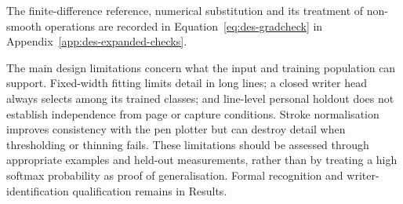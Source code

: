The finite-difference reference, numerical substitution and its treatment of non-smooth operations are recorded in Equation~\ref{eq:des-gradcheck} in Appendix~\ref{app:des-expanded-checks}.

The main design limitations concern what the input and training population can support. Fixed-width fitting limits detail in long lines; a closed writer head always selects among its trained classes; and line-level personal holdout does not establish independence from page or capture conditions. Stroke normalisation improves consistency with the pen plotter but can destroy detail when thresholding or thinning fails. These limitations should be assessed through appropriate examples and held-out measurements, rather than by treating a high softmax probability as proof of generalisation. Formal recognition and writer-identification qualification remains in Results.
\FloatBarrier

